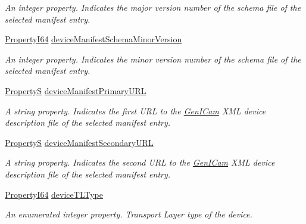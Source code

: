 \begin{DoxyCompactItemize}
\begin{DoxyCompactList}\small\item\em An integer property. Indicates the major version number of the schema file of the selected manifest entry. \end{DoxyCompactList}\item 
\hyperlink{group___common_interface_ga81749b2696755513663492664a18a893}{Property\+I64} \hyperlink{classmv_i_m_p_a_c_t_1_1acquire_1_1_gen_i_cam_1_1_device_control_ac7bf26e02f8c8c0fc2cae2e4cb822080}{device\+Manifest\+Schema\+Minor\+Version}
\begin{DoxyCompactList}\small\item\em An integer property. Indicates the minor version number of the schema file of the selected manifest entry. \end{DoxyCompactList}\item 
\hyperlink{classmv_i_m_p_a_c_t_1_1acquire_1_1_property_s}{Property\+S} \hyperlink{classmv_i_m_p_a_c_t_1_1acquire_1_1_gen_i_cam_1_1_device_control_a7149dfeeae3a7f842d169ba9618610a9}{device\+Manifest\+Primary\+U\+R\+L}
\begin{DoxyCompactList}\small\item\em A string property. Indicates the first U\+R\+L to the \hyperlink{namespacemv_i_m_p_a_c_t_1_1acquire_1_1_gen_i_cam}{Gen\+I\+Cam} X\+M\+L device description file of the selected manifest entry. \end{DoxyCompactList}\item 
\hyperlink{classmv_i_m_p_a_c_t_1_1acquire_1_1_property_s}{Property\+S} \hyperlink{classmv_i_m_p_a_c_t_1_1acquire_1_1_gen_i_cam_1_1_device_control_a3e45ae9eba3ba1a6af50a3a2f4f789c7}{device\+Manifest\+Secondary\+U\+R\+L}
\begin{DoxyCompactList}\small\item\em A string property. Indicates the second U\+R\+L to the \hyperlink{namespacemv_i_m_p_a_c_t_1_1acquire_1_1_gen_i_cam}{Gen\+I\+Cam} X\+M\+L device description file of the selected manifest entry. \end{DoxyCompactList}\item 
\hyperlink{group___common_interface_ga81749b2696755513663492664a18a893}{Property\+I64} \hyperlink{classmv_i_m_p_a_c_t_1_1acquire_1_1_gen_i_cam_1_1_device_control_a014a8319e9e0b720809caf29398e3b8b}{device\+T\+L\+Type}
\begin{DoxyCompactList}\small\item\em An enumerated integer property. Transport Layer type of the device. \end{DoxyCompactList}\item 

\end{DoxyCompactItemize}
